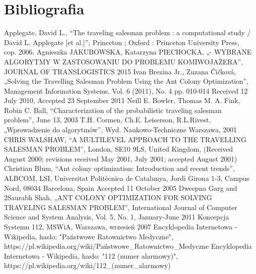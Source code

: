 \documentclass[12pt]{article} %
\begin{document}
\newpage

\section{Bibliografia}

\begin{thebibliography}{99}
Applegate, David L., “The traveling salesman problem : a computational study / David L. Applegate [et al.]”, Princeton ; Oxford : Princeton University Press, cop. 2006.
Agnieszka JAKUBOWSKA, Katarzyna PIECHOCKA, „- WYBRANE ALGORYTMY W ZASTOSOWANIU DO PROBLEMU KOMIWOJAŻERA”, JOURNAL OF TRANSLOGISTICS 2015
Ivan Brezina Jr., Zuzana Čičková, „Solving the Travelling Salesman Problem Using the Ant Colony Optimization”, Management Information Systems, Vol. 6 (2011), No. 4 pp. 010-014 Received 12 July 2010, Accepted 23 September 2011
Neill E. Bowler, Thomas M. A. Fink, Robin C. Ball, “Characterization of the probabilistic traveling salesman problem”, June 13, 2003
T.H. Cormen, Ch.E. Leiserson, R.L.Rivest, „Wprowadzenie do algorytmów”, Wyd. Naukowo-Techniczne Warszawa, 2001
CHRIS WALSHAW, “A MULTILEVEL APPROACH TO THE TRAVELLING SALESMAN PROBLEM”, London, SE10 9LS, United Kingdom, (Received August 2000; revisions received May 2001, July 2001; accepted August 2001)
Christian Blum, “Ant colony optimization: Introduction and recent trends”, ALBCOM, LSI, Universitat Politècnica de Catalunya, Jordi Girona 1-3, Campus Nord, 08034 Barcelona, Spain Accepted 11 October 2005
Dweepna Garg and 2Saurabh Shah, „ANT COLONY OPTIMIZATION FOR SOLVING TRAVELING SALESMAN PROBLEM”, International Journal of Computer Science and System Analysis, Vol. 5, No. 1, January-June 2011
Koncepcja Systemu 112, MSWiA, Warszawa, wrzesień 2007
Encyklopedia Internetowa - Wikipedia, hasło: "Państwowe Ratownictwo Medyczne",
https://pl.wikipedia.org/wiki/Państwowe\_Ratownictwo\_Medyczne
Encyklopedia Internetowa - Wikipedia, hasło: "112 (numer alarmowy)",
https://pl.wikipedia.org/wiki/112\_(numer\_alarmowy)




\end{thebibliography}

\end{document}

